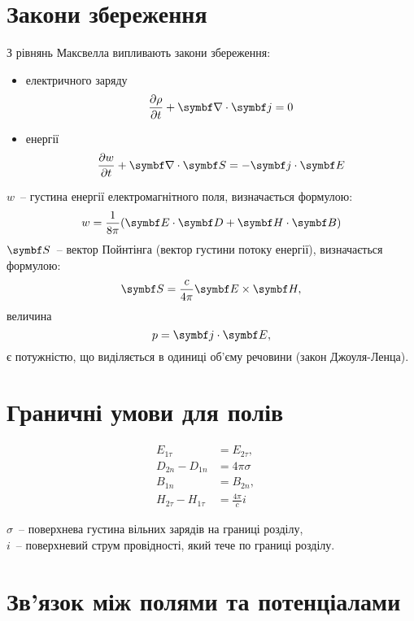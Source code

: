 \section{Закони збереження}

З рівнянь Максвелла випливають закони збереження:
\begin{itemize}
	\item електричного заряду
	      \begin{equation}
		      \frac{\partial \rho}{\partial t} + \divg\vect{j} = 0
	      \end{equation}
	\item енергії
	      \begin{equation}
		      \frac{\partial w}{\partial t} + \divg\vect{S} = -  \vect{j}\cdot\Efield
	      \end{equation}
\end{itemize}
$ w $~-- густина енергії електромагнітного поля, визначається формулою:
\begin{equation}
	w = \frac{1}{8\pi} (\Efield\cdot\Dfield + \Hfield\cdot\Bfield) 
\end{equation}
\noindent%
$ \vect{S} $~-- вектор Пойнтінга (вектор густини потоку енергії), визначається формулою:
\begin{equation}
	\vect{S} = \frac{c}{4\pi} \Efield\times\Hfield,
\end{equation}
величина
\begin{equation}
	p =\vect{j}\cdot\Efield ,
\end{equation}
є потужністю, що виділяється в одиниці об'єму речовини (закон Джоуля-Ленца).

\section{Граничні умови для полів}

\begin{align}
	E_{1\tau} &= E_{2\tau}, \\
	D_{2n} - D_{1n} &= 4\pi\sigma            \\
	B_{1n} &= B_{2n}, \quad       \\
	H_{2\tau} - H_{1\tau} &= \frac{4\pi}{c}i
\end{align}

\noindent%
$\sigma$~-- поверхнева густина вільних зарядів на границі розділу,\\
$i$~-- поверхневий струм провідності, який тече по границі розділу.

\section{Зв'язок між полями та потенціалами}

